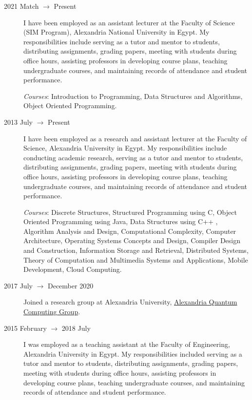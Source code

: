 \documentclass[margin,line]{resume}
\begin{document}
\begin{resume}
\begin{description}
		\item[2021 Match $\rightarrow$ Present] I have been employed as an assistant lecturer at the Faculty of Science (SIM Program), Alexandria National University in Egypt. My responsibilities include serving as a tutor and mentor to students, distributing assignments, grading papers, meeting with students during office hours, assisting professors in developing course plans, teaching undergraduate courses, and maintaining records of attendance and student performance.

			\emph{Courses}: Introduction to Programming, Data Structures and Algorithms, Object Oriented Programming.

		\item[2013 July $\rightarrow$ Present]  I have been employed as a research and assistant lecturer at the Faculty of Science, Alexandria University in Egypt. My responsibilities include conducting academic research, serving as a tutor and mentor to students, distributing assignments, grading papers, meeting with students during office hours, assisting professors in developing course plans, teaching undergraduate courses, and maintaining records of attendance and student performance.

			\emph{Courses}: Discrete Structures, Structured Programming using C, Object Oriented Programming using Java, Data Structures using C++ , Algorithm Analysis and Design, Computational Complexity, Computer Architecture, Operating Systems Concepts and Design, Compiler Design and Construction, Information Storage and Retrieval, Distributed Systems, Theory of Computation and Multimedia Systems and Applications, Mobile Development, Cloud Computing.


		\item[2017 July $\rightarrow$ December 2020 ]  Joined a research group at Alexandria University, \href{http://www.sci.p.alexu.edu.eg/~aleqcg/index.html}{Alexandria Quantum Computing Group}.




		\item[2015 February $\rightarrow$ 2018 July]  I was employed as a teaching assistant at the Faculty of Engineering, Alexandria University in Egypt. My responsibilities included serving as a tutor and mentor to students, distributing assignments, grading papers, meeting with students during office hours, assisting professors in developing course plans, teaching undergraduate courses, and maintaining records of attendance and student performance.


\end{description}
\end{resume}
\end{document}
